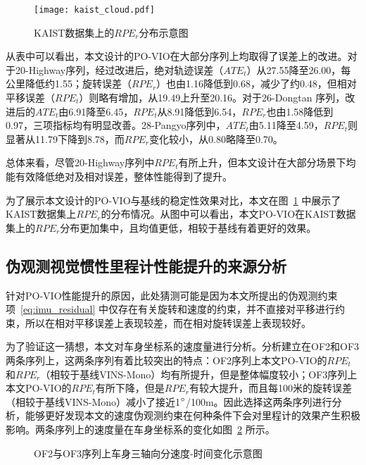 \begin{figure}
  \centering
  \texttt{[image: kaist\_cloud.pdf]}
  \caption{KAIST数据集上的$RPE_r$\textdownarrow{}分布示意图}
  \label{fig:vio_kaist}
\end{figure}

从表中可以看出，本文设计的PO-VIO在大部分序列上均取得了误差上的改进。对于20-Highway序列，经过改进后，绝对轨迹误差（$ATE_t$）从27.55降至26.00，每公里降低约1.55；旋转误差（$RPE_r$）也由1.16降低到0.68，减少了约0.48，但相对平移误差（$RPE_t$）则略有增加，从19.49上升至20.16。对于26-Dongtan 序列，改进后的$ATE_t$由6.91降至6.45，$RPE_t$从8.91降低到6.54，$RPE_r$也由1.58降低到0.97，三项指标均有明显改善。28-Pangyo序列中，$ATE_t$由5.11降至4.59，$RPE_t$则显著从11.79下降到8.78，而$RPE_r$变化较小，从0.80略降至0.70。

总体来看，尽管20-Highway序列中$RPE_t$有所上升，但本文设计在大部分场景下均能有效降低绝对及相对误差，整体性能得到了提升。

为了展示本文设计的PO-VIO与基线的稳定性效果对比，本文在图~\ref{fig:vio_kaist} 中展示了KAIST数据集上$RPE_r$\textdownarrow{}的分布情况。从图中可以看出，本文PO-VIO在KAIST数据集上的$RPE_r$\textdownarrow{}分布更加集中，且均值更低，相较于基线有着更好的效果。

\subsection{伪观测视觉惯性里程计性能提升的来源分析}
针对PO-VIO性能提升的原因，此处猜测可能是因为本文所提出的伪观测约束项~\eqref{eq:imu_residual} 中仅存在有关旋转和速度的约束，并不直接对平移进行约束，所以在相对平移误差上表现较差，而在相对旋转误差上表现较好。

为了验证这一猜想，本文对车身坐标系的速度量进行分析。分析建立在OF2和OF3两条序列上，这两条序列有着比较突出的特点：OF2序列上本文PO-VIO的$RPE_t$和$RPE_r$（相较于基线VINS-Mono）均有所提升，但是整体幅度较小；OF3序列上本文PO-VIO的$RPE_t$有所下降，但是$RPE_r$有较大提升，而且每100米的旋转误差（相较于基线VINS-Mono）减小了接近1$\degree$/100m。因此选择这两条序列进行分析，能够更好发现本文的速度伪观测约束在何种条件下会对里程计的效果产生积极影响。两条序列上的速度量在车身坐标系的变化如图~\ref{fig:VIO_velocity} 所示。

\begin{figure}
  \centering
  \caption{OF2与OF3序列上车身三轴向分速度-时间变化示意图}
  \label{fig:VIO_velocity}
\end{figure}

